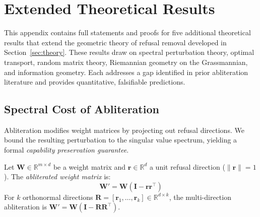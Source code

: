 \appendix

\section{Extended Theoretical Results}
\label{app:theory}

This appendix contains full statements and proofs for five additional theoretical results that extend the geometric theory of refusal removal developed in Section~\ref{sec:theory}.
These results draw on spectral perturbation theory, optimal transport, random matrix theory, Riemannian geometry on the Grassmannian, and information geometry.
Each addresses a gap identified in prior abliteration literature and provides quantitative, falsifiable predictions.

\subsection{Spectral Cost of Abliteration}
\label{app:spectral_cost}

Abliteration modifies weight matrices by projecting out refusal directions.
We bound the resulting perturbation to the singular value spectrum, yielding a formal \emph{capability preservation guarantee}.

\begin{definition}
\label{def:abliteration}
Let $\mathbf{W} \in \mathbb{R}^{m \times d}$ be a weight matrix and $\mathbf{r} \in \mathbb{R}^d$ a unit refusal direction ($\|\mathbf{r}\| = 1$).
The \emph{abliterated weight matrix} is:
\begin{equation}
    \mathbf{W}' = \mathbf{W}(\mathbf{I} - \mathbf{r}\mathbf{r}^\top)
\end{equation}
For $k$ orthonormal directions $\mathbf{R} = [\mathbf{r}_1, \ldots, \mathbf{r}_k] \in \mathbb{R}^{d \times k}$, the multi-direction abliteration is $\mathbf{W}' = \mathbf{W}(\mathbf{I} - \mathbf{R}\mathbf{R}^\top)$.
\end{definition}

